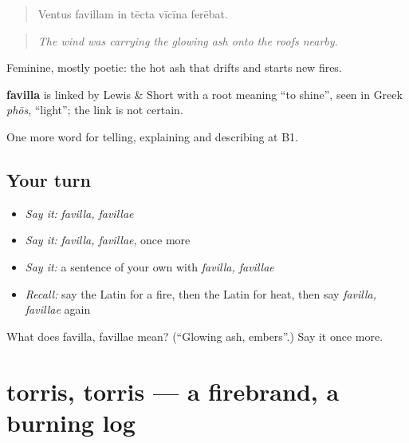 \begin{quote}
Ventus favillam in tēcta vīcīna ferēbat.
\end{quote}

\begin{quote}
\emph{The wind was carrying the glowing ash onto the roofs nearby.}
\end{quote}

Feminine, mostly poetic: the hot ash that drifts and starts new fires.

\begin{cousinweb}
\textbf{favilla} is linked by Lewis \& Short with a root meaning \textquotedblleft{}to shine\textquotedblright{}, seen in Greek \emph{phōs}, \textquotedblleft{}light\textquotedblright{}; the link is not certain.
\end{cousinweb}

\begin{grammarlens}[title={What you've built}]
One more word for telling, explaining and describing at B1.
\end{grammarlens}

\subsection*{Your turn}
\begin{itemize}
\raggedright
  \item \emph{Say it:} \emph{favilla, favillae}
  \item \emph{Say it:} \emph{favilla, favillae}, once more
  \item \emph{Say it:} a sentence of your own with \emph{favilla, favillae}
  \item \emph{Recall:} say the Latin for a fire, then the Latin for heat, then say \emph{favilla, favillae} again
\end{itemize}

\begin{tcolorbox}[breakable,colback=teal!4,colframe=teal!35!black,title={Before you move on}]
What does favilla, favillae mean? (\textquotedblleft{}Glowing ash, embers\textquotedblright{}.) Say it once more.
\end{tcolorbox}
\section[torris, torris]{torris, torris — a firebrand, a burning log}

\label{lesson:LA-C317-torris}



